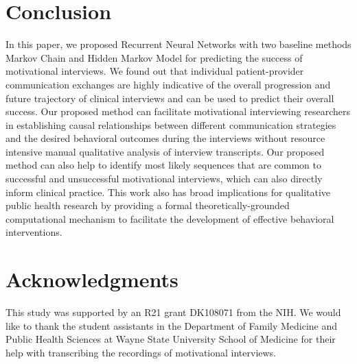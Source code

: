 \documentclass{amia_summit_2018}
\begin{document}
\section*{Conclusion}
In this paper, we proposed Recurrent Neural Networks with two baseline methods Markov Chain and Hidden Markov Model for predicting the success of motivational interviews. We found out that individual patient-provider communication exchanges are highly indicative of the overall progression and future trajectory of clinical interviews and can be used to predict their overall success. Our proposed method can facilitate motivational interviewing researchers in establishing causal relationships between different communication strategies and the desired behavioral outcomes during the interviews without resource intensive manual qualitative analysis of interview transcripts. Our proposed method can also help to identify most likely sequences that are common to successful and unsuccessful motivational interviews, which can also directly inform clinical practice. This work also has broad implications for qualitative public health research by providing a formal theoretically-grounded computational mechanism to facilitate the development of effective behavioral interventions.

\section*{Acknowledgments}
This study was supported by an R21 grant DK108071 from the NIH. We would like to thank the student assistants in the Department of Family Medicine and Public Health Sciences at Wayne State University School of Medicine for their help with transcribing the recordings of motivational interviews. 



\end{document}
